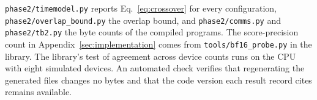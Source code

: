 \texttt{phase2/timemodel.py} reports Eq.~\ref{eq:crossover} for every configuration,
\texttt{phase2/overlap\_bound.py} the overlap bound, and \texttt{phase2/comms.py} and
\texttt{phase2/tb2.py} the byte counts of the compiled programs. The score-precision count in
Appendix~\ref{sec:implementation} comes from \texttt{tools/bf16\_probe.py} in the library. The
library's test of agreement across device counts runs on the CPU with eight simulated devices.
An automated check verifies that regenerating the generated files changes no bytes and that
the code version each result record cites remains available.
